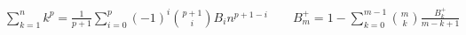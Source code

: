 $\sum_{k=1}^{n}k^p = \frac{1}{p+1}\sum_{i=0}^{p}(-1)^i\binom{p+1}{i}B_in^{p+1-i} \quad \quad B_m^+=1-\sum_{k=0}^{m-1}\binom{m}{k}\frac{B_k^+}{m-k+1}$
